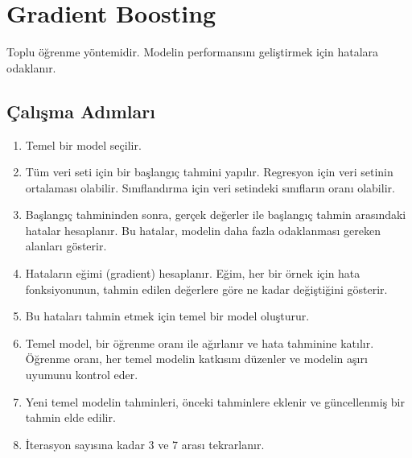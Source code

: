 \section{Gradient Boosting}
Toplu öğrenme yöntemidir. Modelin performansını geliştirmek için hatalara odaklanır.

\subsection{Çalışma Adımları}
\begin{enumerate}
    \item Temel bir model seçilir.
    \item Tüm veri seti için bir başlangıç tahmini yapılır. Regresyon için veri setinin ortalaması olabilir. Sınıflandırma için veri setindeki sınıfların oranı olabilir.
    \item Başlangıç tahmininden sonra, gerçek değerler ile başlangıç tahmin arasındaki hatalar hesaplanır. Bu hatalar, modelin daha fazla odaklanması gereken alanları gösterir.
    \item Hataların eğimi (gradient) hesaplanır. Eğim, her bir örnek için hata fonksiyonunun, tahmin edilen değerlere göre ne kadar değiştiğini gösterir.
    \item Bu hataları tahmin etmek için temel bir model oluşturur.
    \item Temel model, bir öğrenme oranı ile ağırlanır ve hata tahminine katılır. Öğrenme oranı, her temel modelin katkısını düzenler ve modelin aşırı uyumunu kontrol eder.
    \item Yeni temel modelin tahminleri, önceki tahminlere eklenir ve güncellenmiş bir tahmin elde edilir.
    \item İterasyon sayısına kadar 3 ve 7 arası tekrarlanır.
\end{enumerate}

